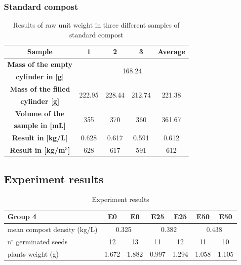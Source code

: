 \documentclass{article}
\begin{document}
\subsubsection{Standard compost}
\renewcommand{\arraystretch}{1.5}
\begin{table}[ht!]
    \centering \vspace{.3cm}
    \caption{Results of raw unit weight in three different samples of standard compost}
    \begin{tabular}{|c|c|c|c|c|}
        \hline
        \textbf{Sample} & \textbf{1} & \textbf{2} & \textbf{3} & \textbf{Average}\\
        \hline
        {\textbf{Mass of the empty}} & \multicolumn{4}{c|}{\multirow{2}{*}{168.24}}\\
        \textbf{cylinder in [g]} & \multicolumn{4}{c|}{}\\
        \hline
        \textbf{Mass of the filled} & \multirow{2}{*}{222.95} & \multirow{2}{*}{228.44} & \multirow{2}{*}{212.74} & \multirow{2}{*}{221.38}\\
        \textbf{cylinder [g]} & & & &\\
        \hline
        \textbf{Volume of the} & \multirow{2}{*}{355} & \multirow{2}{*}{370} & \multirow{2}{*}{360} & \multirow{2}{*}{361.67}\\
        \textbf{sample in [mL]} & & & &\\
        \hline
        \textbf{Result in [kg/L]} & 0.628 & 0.617 & 0.591 & 0.612\\
        \hline
        \textbf{Result in [kg/m$^3$]} & 628 & 617 & 591 & 612\\
        \hline
    \end{tabular}
\end{table}

\newpage
\subsection{Experiment results}
\renewcommand{\arraystretch}{1.5}
\begin{table}[ht!]
    \centering \vspace{.3cm}
    \caption{Experiment results}
    \begin{tabular}{|l|c|c|c|c|c|c|}
        \hline
        \textbf{Group 4} & \textbf{E0} & \textbf{E0} & \textbf{E25} & \textbf{E25} & \textbf{E50} & \textbf{E50} \\
        \hline
        mean compost density (kg/L) & \multicolumn{2}{c|}{0.325} & \multicolumn{2}{c|}{0.382} & \multicolumn{2}{c|}{0.438}\\
        \hline
        n$^{\circ}$ germinated seeds & 12 & 13 & 11 & 12 & 11 & 10\\
        \hline
        plants weight (g) & 1.672 & 1.882 & 0.997 & 1.294 & 1.058 & 1.105\\
        \hline
    \end{tabular}
\end{table}
\end{document}
